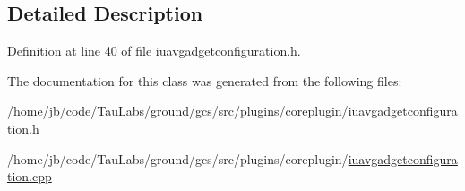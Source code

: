 \subsection{\-Detailed \-Description}


\-Definition at line 40 of file iuavgadgetconfiguration.\-h.



\-The documentation for this class was generated from the following files\-:\begin{DoxyCompactItemize}
\item 
/home/jb/code/\-Tau\-Labs/ground/gcs/src/plugins/coreplugin/\hyperlink{iuavgadgetconfiguration_8h}{iuavgadgetconfiguration.\-h}\item 
/home/jb/code/\-Tau\-Labs/ground/gcs/src/plugins/coreplugin/\hyperlink{iuavgadgetconfiguration_8cpp}{iuavgadgetconfiguration.\-cpp}\end{DoxyCompactItemize}
